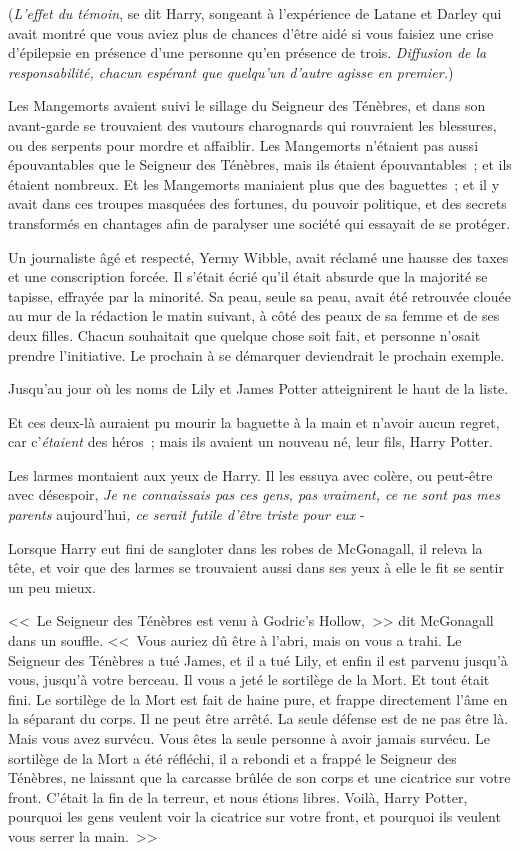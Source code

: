 (\emph{L'effet du témoin}, se dit Harry, songeant à l'expérience de Latane et Darley qui avait montré que vous aviez plus de chances d'être aidé si vous faisiez une crise d'épilepsie en présence d'une personne qu'en présence de trois. \emph{Diffusion de la responsabilité, chacun espérant que quelqu'un d'autre agisse en premier.})

Les Mangemorts avaient suivi le sillage du Seigneur des Ténèbres, et dans son avant-garde se trouvaient des vautours charognards qui rouvraient les blessures, ou des serpents pour mordre et affaiblir. Les Mangemorts n'étaient pas aussi épouvantables que le Seigneur des Ténèbres, mais ils étaient épouvantables~; et ils étaient nombreux. Et les Mangemorts maniaient plus que des baguettes~; et il y avait dans ces troupes masquées des fortunes, du pouvoir politique, et des secrets transformés en chantages afin de paralyser une société qui essayait de se protéger.

Un journaliste âgé et respecté, Yermy Wibble, avait réclamé une hausse des taxes et une conscription forcée. Il s'était écrié qu'il était absurde que la majorité se tapisse, effrayée par la minorité. Sa peau, seule sa peau, avait été retrouvée clouée au mur de la rédaction le matin suivant, à côté des peaux de sa femme et de ses deux filles. Chacun souhaitait que quelque chose soit fait, et personne n'osait prendre l'initiative. Le prochain à se démarquer deviendrait le prochain exemple.

Jusqu'au jour où les noms de Lily et James Potter atteignirent le haut de la liste.

Et ces deux-là auraient pu mourir la baguette à la main et n'avoir aucun regret, car c'\emph{étaient} des héros~; mais ils avaient un nouveau né, leur fils, Harry Potter.

Les larmes montaient aux yeux de Harry. Il les essuya avec colère, ou peut-être avec désespoir, \emph{Je ne connaissais pas ces gens, pas vraiment, ce ne sont pas mes parents} aujourd'hui\emph{, ce serait futile d'être triste pour eux} -

Lorsque Harry eut fini de sangloter dans les robes de McGonagall, il releva la tête, et voir que des larmes se trouvaient aussi dans ses yeux à elle le fit se sentir un peu mieux.

<<~Le Seigneur des Ténèbres est venu à Godric's Hollow,~>> dit McGonagall dans un souffle. <<~Vous auriez dû être à l'abri, mais on vous a trahi. Le Seigneur des Ténèbres a tué James, et il a tué Lily, et enfin il est parvenu jusqu'à vous, jusqu'à votre berceau. Il vous a jeté le sortilège de la Mort. Et tout était fini. Le sortilège de la Mort est fait de haine pure, et frappe directement l'âme en la séparant du corps. Il ne peut être arrêté. La seule défense est de ne pas être là. Mais vous avez survécu. Vous êtes la seule personne à avoir jamais survécu. Le sortilège de la Mort a été réfléchi, il a rebondi et a frappé le Seigneur des Ténèbres, ne laissant que la carcasse brûlée de son corps et une cicatrice sur votre front. C'était la fin de la terreur, et nous étions libres. Voilà, Harry Potter, pourquoi les gens veulent voir la cicatrice sur votre front, et pourquoi ils veulent vous serrer la main.~>>


